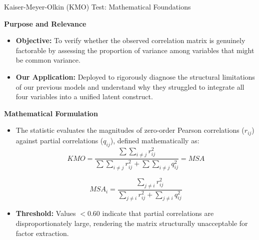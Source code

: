 \documentclass[8pt, aspectratio=169]{beamer}
\begin{document}
\begin{frame}{Kaiser-Meyer-Olkin (KMO) Test: Mathematical Foundations}

\textbf{Purpose and Relevance}
\begin{itemize}
    \item \textbf{Objective:} To verify whether the observed correlation matrix is genuinely factorable by assessing the proportion of variance among variables that might be common variance.
    \item \textbf{Our Application:} Deployed to rigorously diagnose the structural limitations of our previous models and understand why they struggled to integrate all four variables into a unified latent construct.
\end{itemize}

\textbf{Mathematical Formulation}
\begin{itemize}
    \item The statistic evaluates the magnitudes of zero-order Pearson correlations ($r_{ij}$) against partial correlations ($q_{ij}$), defined mathematically as:
    $$ KMO = \frac{\sum{\sum_{i \neq j} r_{ij}^2}}{\sum{\sum_{i \neq j} r_{ij}^2} + \sum{\sum_{i \neq j} q_{ij}^2}} = MSA $$
    
\[MSA_i = \frac{\sum_{j \neq i} r_{ij}^2}{\sum_{j \neq i} r_{ij}^2 + \sum_{j \neq i} q_{ij}^2}\]

    \item \textbf{Threshold:} Values $< 0.60$ indicate that partial correlations are disproportionately large, rendering the matrix structurally unacceptable for factor extraction.
\end{itemize}

\end{frame}

\end{document}
